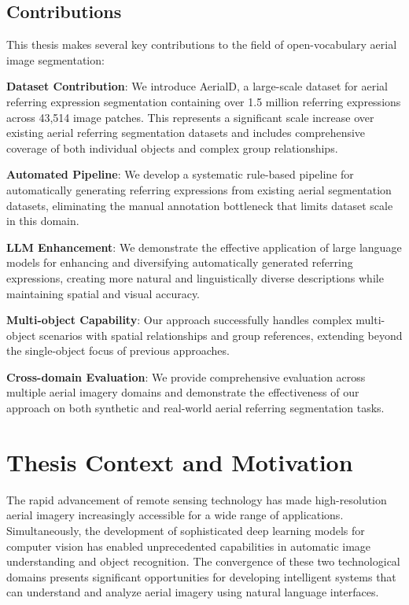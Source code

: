\subsection{Contributions}

This thesis makes several key contributions to the field of open-vocabulary aerial image segmentation:

\textbf{Dataset Contribution}: We introduce AerialD, a large-scale dataset for aerial referring expression segmentation containing over 1.5 million referring expressions across 43,514 image patches. This represents a significant scale increase over existing aerial referring segmentation datasets and includes comprehensive coverage of both individual objects and complex group relationships.

\textbf{Automated Pipeline}: We develop a systematic rule-based pipeline for automatically generating referring expressions from existing aerial segmentation datasets, eliminating the manual annotation bottleneck that limits dataset scale in this domain.

\textbf{LLM Enhancement}: We demonstrate the effective application of large language models for enhancing and diversifying automatically generated referring expressions, creating more natural and linguistically diverse descriptions while maintaining spatial and visual accuracy.

\textbf{Multi-object Capability}: Our approach successfully handles complex multi-object scenarios with spatial relationships and group references, extending beyond the single-object focus of previous approaches.

\textbf{Cross-domain Evaluation}: We provide comprehensive evaluation across multiple aerial imagery domains and demonstrate the effectiveness of our approach on both synthetic and real-world aerial referring segmentation tasks.
\section{Thesis Context and Motivation}
The rapid advancement of remote sensing technology has made high-resolution aerial imagery increasingly accessible for a wide range of applications. Simultaneously, the development of sophisticated deep learning models for computer vision has enabled unprecedented capabilities in automatic image understanding and object recognition. The convergence of these two technological domains presents significant opportunities for developing intelligent systems that can understand and analyze aerial imagery using natural language interfaces.

